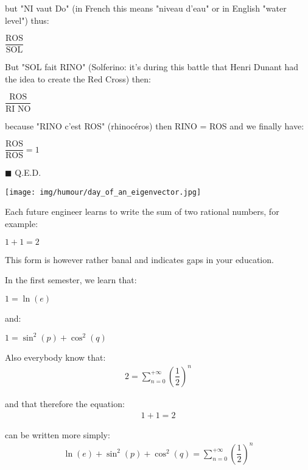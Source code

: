 	but "NI vaut Do" (in French this means "niveau d'eau" or in English "water level") thus:
	\begin{center}
	$\dfrac{\text{ROS}}{\text{SOL}}$  
	\end{center}
	
	But "SOL fait RINO" (Solferino: it's during this battle that Henri Dunant had the idea to create the Red Cross) then: 
	\begin{center}
	$\dfrac{\text{ROS}}{\text{RI NO}}$  
	\end{center}
	
	because "RINO c'est ROS" (rhinocéros) then RINO = ROS and we finally have: 
	\begin{center}
	$\dfrac{\text{ROS}}{\text{ROS}}=1$  
	\end{center}

	\begin{flushright}
		$\blacksquare$  Q.E.D.
	\end{flushright}	

	\begin{center}\underline{\hspace{5 cm}}\end{center}
	\begin{center}
		\texttt{[image: img/humour/day\_of\_an\_eigenvector.jpg]}	
	\end{center}
	Each future engineer learns to write the sum of two rational numbers, for example:
	\begin{center}
	$1+1=2$  
	\end{center}
	
	This form is however rather banal and indicates gaps in your education.
	
	In the first semester, we learn that:
	\begin{center}
	$1=\ln(e)$  
	\end{center}
	
	and:
	\begin{center}
	$1=\sin^2(p)+\cos^2(q)$  
	\end{center}
	
	Also everybody know that:
	\begin{gather*}
	2=\sum_{n=0}^{+\infty} \left( \dfrac{1}{2} \right)^n
	\end{gather*}
	
	and that therefore the equation:
	\begin{gather*}
	1+1=2
	\end{gather*}
	
	can be written more simply:
	\begin{gather*}
	\ln(e)+\sin^2(p)+\cos^2(q)=\sum_{n=0}^{+\infty} \left( \dfrac{1}{2} \right)^n
	\end{gather*}
	
